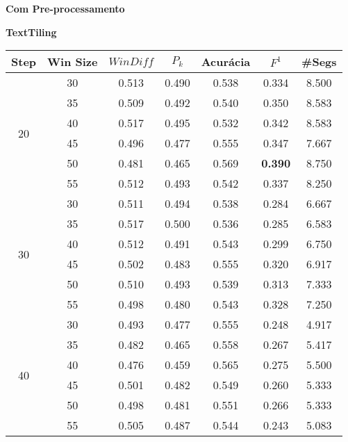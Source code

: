 \documentclass{article}
\begin{document}
 
\small

\pagestyle{empty}

{  
\Large
\center
	\textbf{Com Pre-processamento}  

}

{  
\large
\center
	\textbf{TextTiling}  

}

\begin{table}[!h]
\center
	\begin{tabular}{|c|c|c|c|c|c|c|}
\hline 

 Step & Win Size & $WinDiff$ & $P_k$ & Acurácia & $F^1$ & \#Segs\\ \hline 
 \multirow{6}{*}{20} 
  & 30 & 0.513 & 0.490 & 0.538 & 0.334 & 8.500  \\ \cline{2-7}
  & 35 & 0.509 & 0.492 & 0.540 & 0.350 & 8.583  \\ \cline{2-7}
  & 40 & 0.517 & 0.495 & 0.532 & 0.342 & 8.583  \\ \cline{2-7}
  & 45 & 0.496 & 0.477 & 0.555 & 0.347 & 7.667  \\ \cline{2-7}
  & 50 & 0.481 & 0.465 & 0.569 & \cellcolor{gray!20} \textbf{0.390} & 8.750  \\ \cline{2-7}
  & 55 & 0.512 & 0.493 & 0.542 & 0.337 & 8.250  \\  \hline 
 \multirow{6}{*}{30} 
  & 30 & 0.511 & 0.494 & 0.538 & 0.284 & 6.667  \\ \cline{2-7}
  & 35 & 0.517 & 0.500 & 0.536 & 0.285 & 6.583  \\ \cline{2-7}
  & 40 & 0.512 & 0.491 & 0.543 & 0.299 & 6.750  \\ \cline{2-7}
  & 45 & 0.502 & 0.483 & 0.555 & 0.320 & 6.917  \\ \cline{2-7}
  & 50 & 0.510 & 0.493 & 0.539 & 0.313 & 7.333  \\ \cline{2-7}
  & 55 & 0.498 & 0.480 & 0.543 & 0.328 & 7.250  \\  \hline 
 \multirow{6}{*}{40} 
  & 30 & 0.493 & 0.477 & 0.555 & 0.248 & 4.917  \\ \cline{2-7}
  & 35 & 0.482 & 0.465 & 0.558 & 0.267 & 5.417  \\ \cline{2-7}
  & 40 & 0.476 & 0.459 & 0.565 & 0.275 & 5.500  \\ \cline{2-7}
  & 45 & 0.501 & 0.482 & 0.549 & 0.260 & 5.333  \\ \cline{2-7}
  & 50 & 0.498 & 0.481 & 0.551 & 0.266 & 5.333  \\ \cline{2-7}
  & 55 & 0.505 & 0.487 & 0.544 & 0.243 & 5.083  \\  \hline 

\end{tabular}
\end{table}
\end{document}
